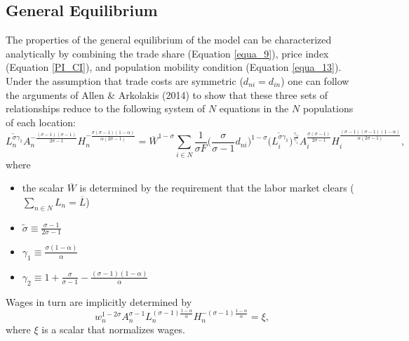 \documentclass[11pt]{article}
\begin{document}
\subsection*{General Equilibrium}
The properties of the general equilibrium of the model can be characterized analytically by combining the trade share (Equation \ref{equa_9}), price index (Equation \ref{PI_CI}), and population mobility condition (Equation \ref{equa_13}). Under the assumption that trade costs are symmetric ($d_{ni} = d_{in}$) one can follow the arguments of Allen \& Arkolakis (2014) to show that these three sets of relationships reduce to the following system of $N$ equations in the $N$ populations of each location:
\begin{equation} \label{equa_16}
L_{n}^{\tilde{\sigma} \gamma_{1}} A_{n}^{- \frac{(\sigma - 1) (\sigma - 1)}{2 \sigma - 1}} H_{n}^{- \frac{\sigma (\sigma - 1) (1-\alpha )}{\alpha (2 \sigma - 1)}} = \overline{W} ^{1- \sigma } \sum_{i \in N} \frac{1}{\sigma F} \Big( \frac{\sigma}{\sigma - 1} d_{ni} \Big)^{1- \sigma} \Big( L_{i}^{\tilde{\sigma } \gamma_{1}} \Big)^{\frac{\gamma_{2}}{\gamma_{1}}} A_{i}^{\frac{\sigma (\sigma - 1)}{2\sigma - 1}} H_{i}^{\frac{(\sigma - 1) (\sigma - 1) (1 - \alpha )}{\alpha (2 \sigma - 1)}},
\end{equation}
where 
\begin{itemize}
\item the scalar $\overline{W}$ is determined by the requirement that the labor market clears ($\sum_{n \in N} L_{n} = \overline{L}$)
\item $\tilde{\sigma} \equiv \frac{\sigma - 1}{2 \sigma - 1}$
\item $\gamma_{1} \equiv \frac{\sigma (1 - \alpha ) }{ \alpha}$
\item $\gamma_{2} \equiv 1  + \frac{\sigma }{\sigma - 1} - \frac{(\sigma -1) (1 - \alpha ) }{\alpha}$
\end{itemize}
Wages in turn are implicitly determined by
\begin{equation} \label{equa_17}
w_{n}^{1- 2 \sigma } A_{n}^{\sigma - 1} L_{n}^{(\sigma - 1) \frac{1 - \alpha}{\alpha}} H_{n}^{- (\sigma - 1 ) \frac{1-\alpha}{\alpha}} = \xi ,
\end{equation}
where $\xi$ is a scalar that normalizes wages.\\\\
\end{document}
